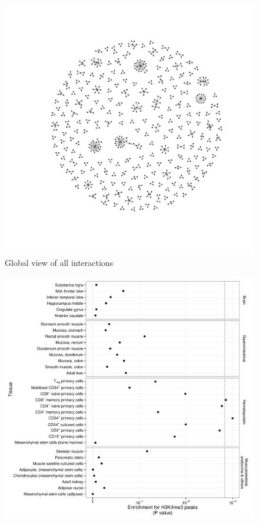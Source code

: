 \documentclass[paper=a4, fontsize=11pt]{scrartcl}	%
\numberwithin{equation}{section}									%
\numberwithin{figure}{section}										%
\numberwithin{table}{section}										%
\begin{document}

\begin{figure}[p]
	\centering
	\includegraphics[width=15cm]{images/color_epi_snps}
	\caption{Global view of all interactions}
	\label{fig:cor_8df}
\end{figure}

\begin{figure}[p]
	\centering
	\includegraphics[width=15cm]{images/EpiSNPs_H3K4me3_Overlap}
	\caption{}
	\label{fig:cor_8df}
\end{figure}
\end{document}
